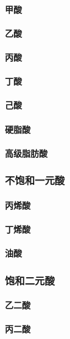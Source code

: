 \documentclass[UTF8]{../03-Chemistry}
\begin{document}
            \paragraph{甲酸}
            \paragraph{乙酸}
            \paragraph{丙酸}
            \paragraph{丁酸}
            \paragraph{己酸}
            \paragraph{硬脂酸}
            \paragraph{高级脂肪酸}
        \subsubsection{不饱和一元酸}
            \paragraph{丙烯酸}
            \paragraph{丁烯酸}
            \paragraph{油酸}
        \subsubsection{饱和二元酸}
            \paragraph{乙二酸}
            \paragraph{丙二酸}
\end{document}
